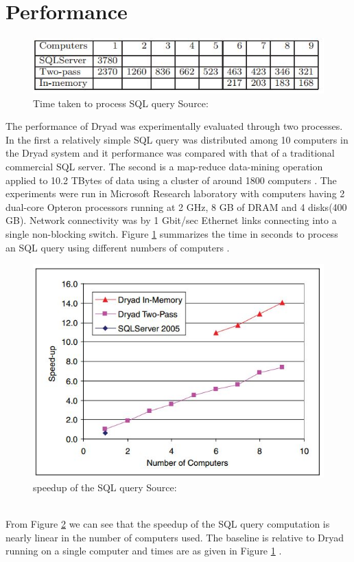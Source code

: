 \documentclass[9pt,twocolumn,twoside]{../../styles/osajnl}
\begin{document}
\section{Performance}
\begin{figure}[htbp]
\begin{center}
\centering
\includegraphics[width=\linewidth]{images/img4}
\caption{Time taken to process SQL query Source:\cite{DryadMSR4}}
\label{fig:time}
\end{center}
\end{figure}
The performance of Dryad was experimentally evaluated through two processes. In the first a relatively simple SQL query was distributed among 10 computers in the Dryad system and it performance was compared with that of a traditional commercial SQL server. The second is a map-reduce data-mining operation applied to 10.2 TBytes of data using a cluster of around 1800 computers \cite{DryadMSR4}. The experiments were run in Microsoft Research laboratory with computers having 2 dual-core Opteron processors running at 2 GHz, 8 GB of DRAM and 4 disks(400 GB). Network connectivity was by 1 Gbit/sec Ethernet links connecting into a single non-blocking switch. Figure \ref{fig:time} summarizes the time in seconds to process an SQL query using different numbers of computers \cite{DryadMSR4}.
\begin{figure}[htbp]
\begin{center}
\centering
\includegraphics[width=\linewidth]{images/img5}
\caption{speedup of the SQL query Source:\cite{DryadMSR4}}
\label{fig:speedup}
\end{center}
\end{figure}
\\From Figure \ref{fig:speedup} we can see that the speedup of the SQL query computation is nearly linear in the number of computers used. The baseline is relative to Dryad running on a single computer and times are as given in Figure  \ref{fig:time} \cite{DryadMSR4}.
\end{document}
